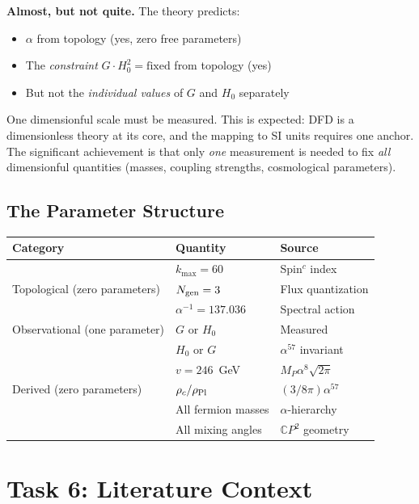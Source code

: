 \documentclass[11pt]{article}
\begin{document}
\textbf{Almost, but not quite.} The theory predicts:
\begin{itemize}
\item $\alpha$ from topology (yes, zero free parameters)
\item The \emph{constraint} $G \cdot H_0^2 = \text{fixed}$ from topology (yes)
\item But not the \emph{individual values} of $G$ and $H_0$ separately
\end{itemize}

One dimensionful scale must be measured. This is expected: DFD is a
dimensionless theory at its core, and the mapping to SI units requires
one anchor. The significant achievement is that only \emph{one} measurement
is needed to fix \emph{all} dimensionful quantities (masses, coupling
strengths, cosmological parameters).

\subsection{The Parameter Structure}

\begin{center}
\begin{tabular}{lll}
\toprule
Category & Quantity & Source \\
\midrule
\multirow{3}{*}{Topological (zero parameters)} & $k_{\max} = 60$ & Spin$^c$ index \\
& $N_{\rm gen} = 3$ & Flux quantization \\
& $\alpha^{-1} = 137.036$ & Spectral action \\
\midrule
Observational (one parameter) & $G$ or $H_0$ & Measured \\
\midrule
\multirow{5}{*}{Derived (zero parameters)} & $H_0$ or $G$ & $\alpha^{57}$ invariant \\
& $v = 246$~GeV & $M_P \alpha^8 \sqrt{2\pi}$ \\
& $\rho_c/\rho_{\rm Pl}$ & $(3/8\pi)\alpha^{57}$ \\
& All fermion masses & $\alpha$-hierarchy \\
& All mixing angles & $\mathbb{C}P^2$ geometry \\
\bottomrule
\end{tabular}
\end{center}

\section{Task 6: Literature Context}
\label{sec:literature}
\end{document}
